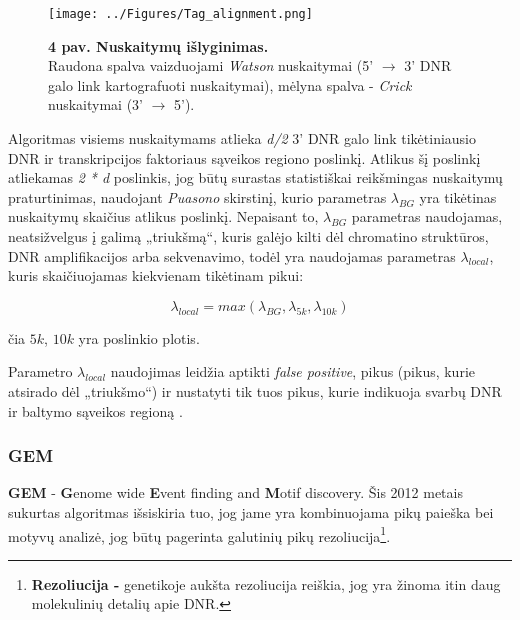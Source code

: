 \documentclass[12pt]{article}
\begin{document}
\begin{figure}[ht]
    \begin{center}
        \captionsetup{justification=centering}
        \texttt{[image: ../Figures/Tag\_alignment.png]}
        \vspace{-1\baselineskip}
        \caption{\small\textbf{4 pav. Nuskaitymų išlyginimas.}\\Raudona spalva
            vaizduojami \emph{Watson} nuskaitymai (5' \(\rightarrow\) 3' DNR
            galo link kartografuoti nuskaitymai),
            mėlyna spalva - \emph{Crick} nuskaitymai (3' \(\rightarrow\) 5').}
        \label{fig:image4}
    \end{center}
\end{figure}

Algoritmas visiems nuskaitymams atlieka \emph{d/2} 3' DNR galo link
tikėtiniausio DNR ir transk\-rip\-ci\-jos faktoriaus sąveikos regiono poslinkį.
Atlikus šį poslinkį atliekamas \emph{2 * d} poslinkis, jog būtų surastas
statistiškai reikšmingas nuskaitymų praturtinimas, naudojant \emph{Puasono}
skirstinį, kurio parametras \(\lambda_{BG}\) yra tikėtinas nuskaitymų skaičius
atlikus poslinkį. Nepaisant to, \(\lambda_{BG}\) parametras naudojamas,
neatsižvelgus į galimą „triukšmą“, kuris galėjo kilti dėl chromatino struktūros,
DNR amplifikacijos arba sekvenavimo, todėl yra naudojamas parametras
\(\lambda_{local}\), kuris skaičiuojamas kiekvienam tikėtinam
pikui:

\begin{equation} \label{lambda_local}
    \lambda_{local} = max(\lambda_{BG}, \lambda_{5k}, \lambda_{10k})
\end{equation}

čia \(5k\), \(10k\) yra poslinkio plotis.

Parametro \(\lambda_{local}\) naudojimas leidžia aptikti \emph{false positive},
pikus (pikus, kurie atsirado dėl „triukšmo“) ir nustatyti tik tuos pikus,
kurie indikuoja svarbų DNR ir baltymo sąveikos regioną \cite{ARTICLE12}.
  
\subsubsection{GEM}
\textbf{GEM} - \textbf{G}enome wide \textbf{E}vent finding and \textbf{M}otif
discovery. Šis 2012 metais sukurtas algoritmas išsiskiria tuo, jog jame yra
kombinuojama pikų paieška bei motyvų analizė, jog būtų pagerinta galutinių pikų
rezoliucija\footnote{\textbf{Rezoliucija - } genetikoje aukšta rezoliucija
reiškia, jog yra žinoma itin daug molekulinių detalių apie DNR.}.\\
\end{document}
